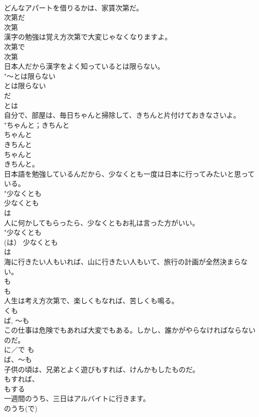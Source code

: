 \documentclass[8pt]{extreport}
\begin{document}
\begin{CJK}{UTF8}{min}
{\\	どんなアパートを借りるかは、家賃次第だ。	
\\	次第だ 
\\	次第 
\\	漢字の勉強は覚え方次第で大変じゃなくなりますよ。	
\\	次第で 
\\	次第 
\\	日本人だから漢字をよく知っているとは限らない。	
\\	"〜とは限らない 
\\	とは限らない 
\\	だ 
\\	とは 
\\	自分で、部屋は、毎日ちゃんと掃除して、きちんと片付けておきなさいよ。	
\\	"ちゃんと；きちんと 
\\	ちゃんと 
\\	きちんと 
\\	ちゃんと 
\\	きちんと。
\\	日本語を勉強しているんだから、少なくとも一度は日本に行ってみたいと思っている。	
\\	"少なくとも 
\\	少なくとも 
\\	は 
\\	人に何かしてもらったら、少なくともお礼は言った方がいい。	
\\	"少なくとも 
\\	(は） 少なくとも 
\\	は 
\\	海に行きたい人もいれば、山に行きたい人もいて、旅行の計画が全然決まらない。	
\\	も 
\\	も 
\\	人生は考え方次第で、楽しくもなれば、苦しくも鳴る。	
\\	くも 
\\	ば, 〜も 
\\	この仕事は危険でもあれば大変でもある。しかし、誰かがやらなければならないのだ。	
\\	{に／で} も 
\\	ば、〜も 
\\	子供の頃は、兄弟とよく遊びもすれば、けんかもしたものだ。	
\\	もすれば、
\\	もする 
\\	一週間のうち、三日はアルバイトに行きます。	
\\	のうち(で) 
}
\end{CJK}
\end{document}
